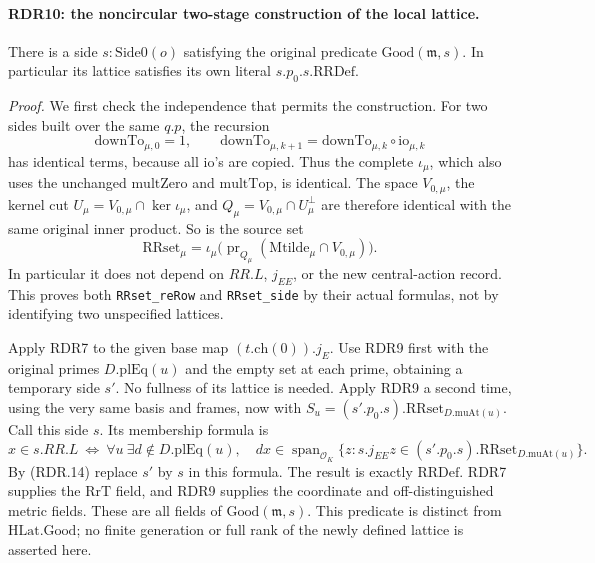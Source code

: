 \paragraph{RDR10: the noncircular two-stage construction of the local lattice.}
\label{claim:RDR10}
There is a side \(s:\mathrm{Side0}(o)\) satisfying the
original predicate \(\mathrm{Good}(\mathfrak m,s)\).
In particular its lattice satisfies its own literal
\(s.p_0.s.\mathrm{RRDef}\).

\emph{Proof.}
We first check the independence that permits the construction.
For two sides built over the same \(q.p\), the recursion
\[
       \mathrm{downTo}_{\mu,0}=1,\qquad
       \mathrm{downTo}_{\mu,k+1}
                   =\mathrm{downTo}_{\mu,k}\circ\mathrm{io}_{\mu,k}
                                                               \tag{RDR.13}
\]
has identical terms, because all \(\mathrm{io}\)'s are copied.
Thus the complete \(\iota_\mu\), which also uses the unchanged
\(\mathrm{multZero}\) and \(\mathrm{multTop}\), is identical.
The space \(V_{0,\mu}\), the kernel cut
\(U_\mu=V_{0,\mu}\cap\ker\iota_\mu\), and
\(Q_\mu=V_{0,\mu}\cap U_\mu^\perp\) are therefore identical
with the same original inner product.  So is the source set
\[
  \mathrm{RRset}_\mu
    =\iota_\mu\bigl(\operatorname{pr}_{Q_\mu}
                          (\mathrm{Mtilde}_\mu\cap V_{0,\mu})\bigr).
                                                               \tag{RDR.14}
\]
In particular it does not depend on \(RR.L\), \(j_{EE}\),
or the new central-action record.  This proves both
\texttt{RRset\_reRow} and \texttt{RRset\_side} by their
actual formulas, not by identifying two unspecified lattices.

Apply RDR7 to the given base map \((t.\mathrm{ch}(0)).j_E\).
Use RDR9 first with the original primes \(D.\mathrm{plEq}(u)\)
and the empty set at each prime, obtaining a temporary side \(s'\).
No fullness of its lattice is needed.  Apply RDR9 a second time,
using the very same basis and frames, now with
\(S_u=(s'.p_0.s).\mathrm{RRset}_{D.\mathrm{muAt}(u)}\).
Call this side \(s\).  Its membership formula is
\[
 x\in s.RR.L\ \Longleftrightarrow\
 \forall u\ \exists d\notin D.\mathrm{plEq}(u),\quad
 dx\in\operatorname{span}_{\mathcal O_K}
 \{z:s.j_{EE}z\in(s'.p_0.s).\mathrm{RRset}_{D.\mathrm{muAt}(u)}\}.
                                                               \tag{RDR.15}
\]
By (RDR.14) replace \(s'\) by \(s\) in this formula.  The
result is exactly \(\mathrm{RRDef}\).  RDR7 supplies the
\(\mathrm{RrT}\) field, and RDR9 supplies the coordinate and
off-distinguished metric fields.  These are all fields of
\(\mathrm{Good}(\mathfrak m,s)\).  This predicate is distinct
from \(\mathrm{HLat.Good}\); no finite generation or full
rank of the newly defined lattice is asserted here.

